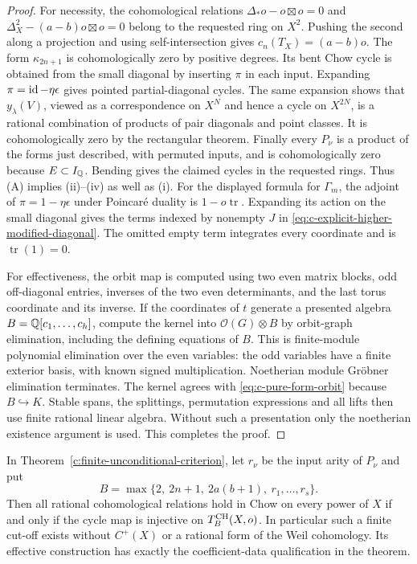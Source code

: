 \begin{proof}
For necessity, the cohomological relations
$\Delta_*o-o\boxtimes o=0$ and
$\Delta_X^2-(a-b)o\boxtimes o=0$ belong to the requested ring
on $X^2$.  Pushing the second along a projection and using
self-intersection gives $c_n(T_X)=(a-b)o$.  The form
$\kappa_{2n+1}$ is cohomologically zero by positive degrees.
Its bent Chow cycle is obtained from the small diagonal by
inserting $\pi$ in each input.  Expanding
$\pi=\operatorname{id}-\eta\epsilon$ gives pointed partial-diagonal cycles.
The same expansion shows that $y_\lambda(V)$, viewed as a
correspondence on $X^N$ and hence a cycle on $X^{2N}$, is a
rational combination of products of pair diagonals and point
classes.  It is cohomologically zero by the rectangular theorem.
Finally every $P_\nu$ is a product of the forms just described,
with permuted inputs, and is cohomologically zero because
$E\subset I_\mathbb Q$.  Bending gives the claimed cycles in the
requested rings.  Thus (A) implies (ii)--(iv) as well as (i).
For the displayed formula for $\Gamma_m$, the adjoint of
$\pi=1-\eta\epsilon$ under Poincar\'e duality is
$1-o\operatorname{tr}$.  Expanding its action on the small
diagonal gives the terms indexed by nonempty $J$ in
\eqref{eq:c-explicit-higher-modified-diagonal}.  The omitted empty
term integrates every coordinate and is
$\operatorname{tr}(1)=0$.

For effectiveness, the orbit map is computed using two even
matrix blocks, odd off-diagonal entries, inverses of the two
even determinants, and the last torus coordinate and its inverse.
If the coordinates of $t$ generate a presented algebra
$B=\mathbb Q[c_1,\ldots,c_h]$, compute the kernel into
$\mathcal O(G)\otimes B$ by orbit-graph elimination, including
the defining equations of $B$.  This is finite-module
polynomial elimination over the even variables: the odd
variables have a finite exterior basis, with known signed
multiplication.  Noetherian module Gr\"obner elimination
terminates.  The kernel agrees with \eqref{eq:c-pure-form-orbit}
because $B\hookrightarrow K$.  Stable spans, the splittings,
permutation expressions and all lifts then use finite rational
linear algebra.  Without such a presentation only the
noetherian existence argument is used.  This completes the proof.
\end{proof}

\begin{corollary}
\label{c:finite-power-cutoff}
In Theorem~\ref{c:finite-unconditional-criterion}, let $r_\nu$
be the input arity of $P_\nu$ and put
\[
 B=\max\{2,\ 2n+1,\ 2a(b+1),\ r_1,\ldots,r_s\}.
\]
Then all rational cohomological relations hold in Chow on every
power of $X$ if and only if the cycle map is injective on
$T_B^{\operatorname{CH}}(X,o)$.  In particular such a finite cut-off exists
without $C^+(X)$ or a rational form of the Weil cohomology.
Its effective construction has exactly the coefficient-data
qualification in the theorem.
\end{corollary}

